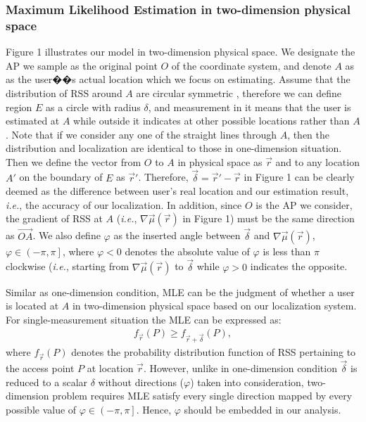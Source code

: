 \documentclass[journal]{IEEEtran}
\newcommand{\ie}{{\em i.e.}}
\begin{document}
\subsubsection{Maximum Likelihood Estimation in two-dimension physical space}

Figure 1 illustrates our model in two-dimension physical space. We designate the AP we sample as the original point $O$ of the coordinate system, and denote $A$ as as the user��s actual location which we focus on estimating. Assume that the distribution of RSS around $A$ are circular symmetric , therefore we can define region $E$ as a circle with radius $\delta$, and measurement in it means that the user is estimated at $A$ while outside it indicates at other possible locations rather than $A$. Note that if we consider any one of the straight lines through $A$, then the distribution and localization are identical to those in one-dimension situation. Then we define the vector from $O$ to $A$ in physical space as $\vec r$ and to any location $A'$ on the boundary of $E$ as $\vec r'$. Therefore, $\vec \delta  = \vec r' - \vec r$ in Figure 1 can be clearly deemed as the difference between user's real location and our estimation result, \ie, the accuracy of our localization. In addition, since $O$ is the AP we consider, the gradient of RSS at $A$ (\ie, $\nabla \vec \mu (\vec r)$ in Figure 1) must be the same direction as $\overrightarrow{OA}$. We also define $\varphi$ as the inserted angle between $\vec \delta $ and $\nabla \vec \mu (\vec r)$, $\varphi  \in \left( { - \pi ,\pi } \right]$, where $\varphi < 0$ denotes the absolute value of $\varphi$ is less than $\pi$ clockwise (\ie, starting from $\nabla \vec \mu (\vec r)$ to $\vec \delta $ while $\varphi  > 0$ indicates the opposite.

Similar as one-dimension condition, MLE can be the judgment of whether a user is located at $A$ in two-dimension physical space based on our localization system. For single-measurement situation the MLE can be expressed as:
\begin{align}
{f_{\vec r}}(P) \ge {f_{\vec r + \vec \delta }}(P),
\end{align}
where ${f_{\vec r}}(P)$ denotes the probability distribution function of RSS pertaining to the access point $P$ at location $\vec r$. However, unlike in one-dimension condition $\vec \delta$ is reduced to a scalar $\delta$ without directions ($\varphi$) taken into consideration, two-dimension problem requires MLE satisfy every single direction mapped by every possible value of $\varphi  \in \left( { - \pi ,\pi } \right]$. Hence, $\varphi$ should be embedded in our analysis.
\end{document}

